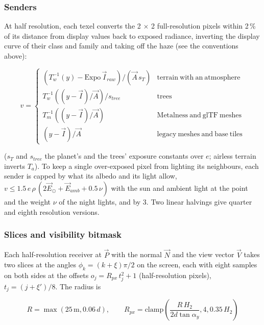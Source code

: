 \documentclass[Orbiter Technical Reference.tex]{subfiles}
\begin{document}
\begin{sloppypar}
\subsubsection{Senders}
At half resolution, each texel converts the 2 $\times$ 2 full-resolution pixels within 2\,\% of its distance from display values back to exposed radiance, inverting the display curve of their class and family and taking off the haze (see the conventions above):

\[ v = \left\{ \begin{array}{ll}
\left(T_{w}^{-1}(y) - \mathrm{Expo}\,\vec{I}_{raw}\right)/(\vec{A}\,s_{T}) & \mathrm{terrain\ with\ an\ atmosphere}\\
T_{w}^{-1}((y - \vec{I})/\vec{A})/s_{tree} & \mathrm{trees}\\
T_{m}^{-1}((y - \vec{I})/\vec{A}) & \mathrm{Metalness\ and\ glTF\ meshes}\\
(y - \vec{I})/\vec{A} & \mathrm{legacy\ meshes\ and\ base\ tiles}
\end{array} \right. \]

\noindent
($s_{T}$ and $s_{tree}$ the planet's and the trees' exposure constants over $e$; airless terrain inverts $T_{a}$). To keep a single over-exposed pixel from lighting its neighbours, each sender is capped by what its albedo and its light allow, $v \le 1.5\,e\,\rho\,(2\vec{E}_{\odot} + \vec{E}_{amb} + 0.5\,\nu)$ with the sun and ambient light at the point and the weight $\nu$ of the night lights, and by 3. Two linear halvings give quarter and eighth resolution versions.

\subsubsection{Slices and visibility bitmask}
Each half-resolution receiver at $\vec{P}$ with the normal $\vec{N}$ and the view vector $\vec{V}$ takes two slices at the angles $\phi_{k} = (k + \xi)\pi/2$ on the screen, each with eight samples on both sides at the offsets $o_{j} = R_{px}\,t_{j}^{2} + 1$ (half-resolution pixels), $t_{j} = (j + \xi')/8$. The radius is

\[ R = \max(25\,\mathrm{m}, 0.06\,d), \qquad R_{px} = \mathrm{clamp}\left(\frac{R\,H_{2}}{2d\tan\alpha_{y}}, 4, 0.35\,H_{2}\right) \]


\end{sloppypar}
\end{document}
